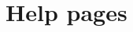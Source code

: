 \documentclass[fleqn]{book}
\begin{document}


\tableofcontents



\appendix
\chapter{Help pages}

\end{document}
